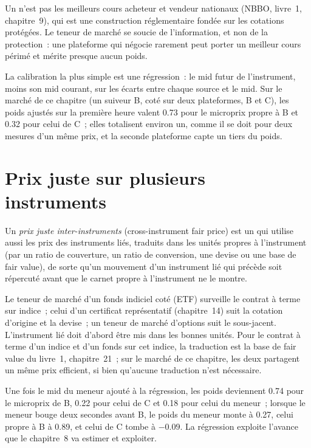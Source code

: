 Un  n'est pas les meilleurs cours acheteur et vendeur nationaux (NBBO, livre~1, chapitre~9), qui est une construction réglementaire fondée sur les cotations protégées.
Le teneur de marché se soucie de l'information, et non de la protection~: une plateforme qui négocie rarement peut porter un meilleur cours périmé et mérite presque aucun poids.

La calibration la plus simple est une régression~: le mid futur de l'instrument, moins son mid courant, sur les écarts entre chaque source et le mid.
Sur le marché de ce chapitre (un suiveur B, coté sur deux plateformes, B et C), les poids ajustés sur la première heure valent 0.73 pour le microprix propre à B et 0.32 pour
celui de C~; elles totalisent environ un, comme il se doit pour deux mesures d'un même prix, et la seconde plateforme capte un tiers du poids.

\section{Prix juste sur plusieurs instruments}

\begin{definition}\label{def:hf:fair-value:cross}
Un \emph{prix juste inter-instruments} (cross-instrument fair price) est un  qui utilise aussi les prix des instruments liés, traduits
dans les unités propres à l'instrument (par un ratio de couverture, un ratio de conversion, une devise ou une base de fair value), de sorte qu'un mouvement d'un instrument lié
qui précède soit répercuté avant que le carnet propre à l'instrument ne le montre.
\end{definition}

Le teneur de marché d'un fonds indiciel coté (ETF) surveille le contrat à terme sur indice~; celui d'un certificat représentatif (chapitre~14) suit la cotation d'origine et la devise~;
un teneur de marché d'options suit le sous-jacent. L'instrument lié doit d'abord être mis dans les bonnes unités. Pour le contrat à terme d'un indice et d'un fonds
sur cet indice, la traduction est la base de fair value du livre~1, chapitre~21~; sur le marché de ce chapitre, les deux partagent un même prix efficient,
si bien qu'aucune traduction n'est nécessaire.

Une fois le mid du meneur ajouté à la régression, les poids deviennent 0.74 pour le microprix de B, 0.22 pour celui de C et 0.18 pour celui du meneur~; lorsque le meneur
bouge deux secondes avant B, le poids du meneur monte à 0.27, celui propre à B à 0.89, et celui de C tombe à $-0.09$. La régression exploite l'avance que le chapitre~8 va
estimer et exploiter.

